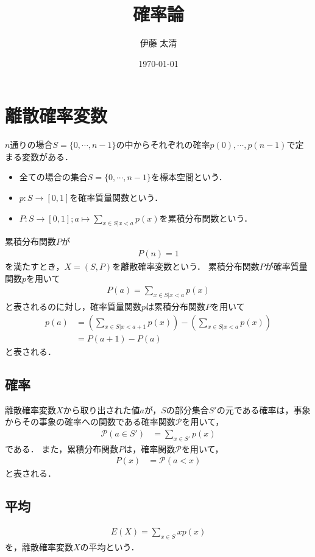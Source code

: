 \documentclass[dvipdfmx]{jsarticle}
\title{確率論}
\author{伊藤 太清}
\date{\today}
\begin{document}
 \maketitle
 \section{離散確率変数}
$n$通りの場合$S=\{0,\cdots,n-1\}$の中からそれぞれの確率$p\left(0\right),\cdots,p\left(n-1\right)$で定まる変数がある．
 \begin{itemize}
  \item 全ての場合の集合$S=\{0,\cdots,n-1\}$を標本空間という．
  \item $p:S\to\left[0,1\right]$を確率質量関数という．
  \item $P:S\to\left[0,1\right];a\mapsto\sum_{x\in S|x<a}p\left(x\right)$を累積分布関数という．
 \end{itemize}
累積分布関数$P$が
 \begin{align}
  P\left(n\right)=1
 \end{align}
を満たすとき，$X=\left(S,P\right)$を離散確率変数という．
累積分布関数$P$が確率質量関数$p$を用いて
 \begin{align}
  P\left(a\right)=\sum_{x\in S|x<a}p\left(x\right)
 \end{align}
と表されるのに対し，確率質量関数$p$は累積分布関数$P$を用いて
 \begin{align}
  p\left(a\right)&=\left(\sum_{x\in S|x<a+1}p\left(x\right)\right)-\left(\sum_{x\in S|x<a}p\left(x\right)\right)\nonumber\\
  &=P\left(a+1\right)-P\left(a\right)
 \end{align}
と表される．
 \subsection{確率}
離散確率変数$X$から取り出された値$a$が，$S$の部分集合$S'$の元である確率は，事象からその事象の確率への関数である確率関数$\mathscr{P}$を用いて，
 \begin{align}
  \mathscr{P}\left(a\in S'\right)&=\sum_{x\in S'}p\left(x\right)
 \end{align}
である．
また，累積分布関数$P$は，確率関数$\mathscr{P}$を用いて，
 \begin{align}
  P\left(x\right)&=\mathscr{P}\left(a<x\right)
 \end{align}
と表される．
 \subsection{平均}
 \begin{align}
  E\left(X\right)=\sum_{x\in S}xp\left(x\right)
 \end{align}
を，離散確率変数$X$の平均という．
\end{document}
